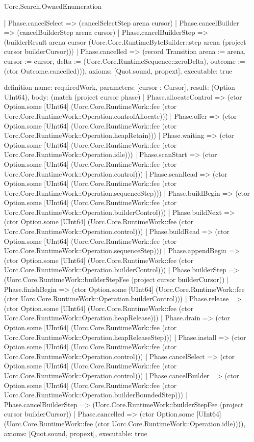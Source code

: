 \begin{lexlean}{Uorc.Search.OwnedEnumeration}
\begin{semanticmodule}
{    | Phase.cancelSelect => (cancelSelectStep arena cursor)
    | Phase.cancelBuilder => (cancelBuilderStep arena cursor)
    | Phase.cancelBuilderStep => (builderResult arena cursor (Uorc.Core.RuntimeByteBuilder::step arena (project cursor builderCursor)))
    | Phase.cancelled => (record Transition {arena := arena, cursor := cursor, delta := (Uorc.Core.RuntimeSequence::zeroDelta), outcome := (ctor Outcome.cancelled)})),
  axioms: [Quot.sound, propext],
  executable: true
}

definition{
  name: requiredWork,
  parameters: [cursor : Cursor],
  result: (Option UInt64),
  body: (match (project cursor phase)
    | Phase.allocateControl => (ctor Option.some [UInt64] (Uorc.Core.RuntimeWork::fee (ctor Uorc.Core.RuntimeWork::Operation.controlAllocate)))
    | Phase.offer => (ctor Option.some [UInt64] (Uorc.Core.RuntimeWork::fee (ctor Uorc.Core.RuntimeWork::Operation.heapRetain)))
    | Phase.waiting => (ctor Option.some [UInt64] (Uorc.Core.RuntimeWork::fee (ctor Uorc.Core.RuntimeWork::Operation.idle)))
    | Phase.scanStart => (ctor Option.some [UInt64] (Uorc.Core.RuntimeWork::fee (ctor Uorc.Core.RuntimeWork::Operation.control)))
    | Phase.scanRead => (ctor Option.some [UInt64] (Uorc.Core.RuntimeWork::fee (ctor Uorc.Core.RuntimeWork::Operation.sequenceStep)))
    | Phase.buildBegin => (ctor Option.some [UInt64] (Uorc.Core.RuntimeWork::fee (ctor Uorc.Core.RuntimeWork::Operation.builderControl)))
    | Phase.buildNext => (ctor Option.some [UInt64] (Uorc.Core.RuntimeWork::fee (ctor Uorc.Core.RuntimeWork::Operation.control)))
    | Phase.buildRead => (ctor Option.some [UInt64] (Uorc.Core.RuntimeWork::fee (ctor Uorc.Core.RuntimeWork::Operation.sequenceStep)))
    | Phase.appendBegin => (ctor Option.some [UInt64] (Uorc.Core.RuntimeWork::fee (ctor Uorc.Core.RuntimeWork::Operation.builderControl)))
    | Phase.builderStep => (Uorc.Core.RuntimeWork::builderStepFee (project cursor builderCursor))
    | Phase.finishBegin => (ctor Option.some [UInt64] (Uorc.Core.RuntimeWork::fee (ctor Uorc.Core.RuntimeWork::Operation.builderControl)))
    | Phase.release => (ctor Option.some [UInt64] (Uorc.Core.RuntimeWork::fee (ctor Uorc.Core.RuntimeWork::Operation.heapRelease)))
    | Phase.drain => (ctor Option.some [UInt64] (Uorc.Core.RuntimeWork::fee (ctor Uorc.Core.RuntimeWork::Operation.heapReleaseStep)))
    | Phase.install => (ctor Option.some [UInt64] (Uorc.Core.RuntimeWork::fee (ctor Uorc.Core.RuntimeWork::Operation.control)))
    | Phase.cancelSelect => (ctor Option.some [UInt64] (Uorc.Core.RuntimeWork::fee (ctor Uorc.Core.RuntimeWork::Operation.control)))
    | Phase.cancelBuilder => (ctor Option.some [UInt64] (Uorc.Core.RuntimeWork::fee (ctor Uorc.Core.RuntimeWork::Operation.builderBoundedStep)))
    | Phase.cancelBuilderStep => (Uorc.Core.RuntimeWork::builderStepFee (project cursor builderCursor))
    | Phase.cancelled => (ctor Option.some [UInt64] (Uorc.Core.RuntimeWork::fee (ctor Uorc.Core.RuntimeWork::Operation.idle)))),
  axioms: [Quot.sound, propext],
  executable: true
}


\end{semanticmodule}
\end{lexlean}
